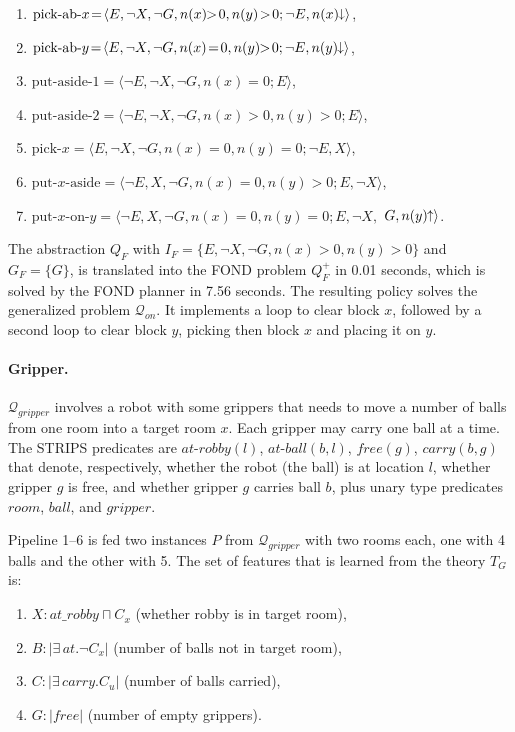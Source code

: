 \documentclass[letterpaper]{article} %
\newcommand{\tup}[1]{\langle #1 \rangle}
\newcommand{\abs}[1]{\ensuremath{\left\vert{#1}\right\vert}}
\newcommand{\Q}{\mathcal{Q}}
\newcommand{\abst}[2]{\tup{#1;#2}}
\newcommand{\pplus}{\hspace{-.05em}\raisebox{.15ex}{\footnotesize$\uparrow$}}
\newcommand{\mminus}{\hspace{-.05em}\raisebox{.15ex}{\footnotesize$\downarrow$}}
\begin{document}
\begin{enumerate}[--]
  \item $\text{pick-ab-$x$}\!=\!\abst{E,\neg X,\neg G,n(x)\!\!>\!0,n(y)\!>\!0}{\neg E,n(x)\mminus}$,
  \item $\text{pick-ab-$y$}\!=\!\abst{E,\neg X,\neg G,n(x)\!=\!0,n(y)\!\!>\!0}{\neg E,n(y)\mminus}$,
  \item $\text{put-aside-1}=\abst{\neg E,\neg X,\neg G,n(x)=0}{E}$,
  \item $\text{put-aside-2}=\abst{\neg E,\neg X,\neg G,n(x)>0,n(y)>0}{E}$,
  \item $\text{pick-$x$}=\abst{E,\neg X,\neg G,n(x)=0,n(y)=0}{\neg E,X}$,
  \item $\text{put-$x$-aside}\!=\!\abst{\neg E,X,\neg G,n(x)=0,n(y)>0}{E,\neg X}$,
  \item $\text{put-$x$-on-$y$} = \langle \neg E, X, \neg G, n(x)=0, n(y)=0; E, \neg X,$ $G, n(y)\pplus \rangle$.
\end{enumerate}

The abstraction $Q_F$  with $I_F\!=\!\{ E, \neg X, \neg G, n(x)\!>\!0, n(y)\!>\!0\}$
and $G_F = \{G\}$, 
is translated into the FOND problem
$Q_F^+$  in 0.01 seconds, which is solved by the FOND planner  in 7.56 seconds.
The resulting policy solves the generalized problem $\Q_{on}$.
It implements a loop  to clear block $x$,  followed by a second  loop to clear block $y$,
picking then block $x$ and placing it on  $y$. 


\paragraph{Gripper.}
$\Q_{gripper}$ involves  a robot with some grippers
that needs to move a number of balls from one room into a target
room $x$. Each gripper may carry one ball at a time.
The STRIPS predicates are $at\text{-}robby(l)$, $at\text{-}ball(b,l)$,
$free(g)$, $carry(b,g)$ that denote, respectively, whether the robot
(the ball) is at location $l$, whether gripper $g$ is free, and whether
gripper $g$ carries ball $b$, plus unary type predicates $room$, $ball$,
and $gripper$. %

Pipeline 1--6 is fed  two instances $P$ from $\Q_{gripper}$  with two
rooms each, one with 4 balls and the other with 5. The set of features that
is learned  from the theory $T_G$ is:
\begin{enumerate}[--]
  \item $X: at\_robby \sqcap C_x$ (whether robby is in target room),
  \item $B: |\exists\,at . \neg C_x|$ (number of balls not in target room),
  \item $C: |\exists\,carry . C_u|$ (number of balls carried),
  \item $G: \abs{free}$ (number of empty grippers).
\end{enumerate}
\end{document}
